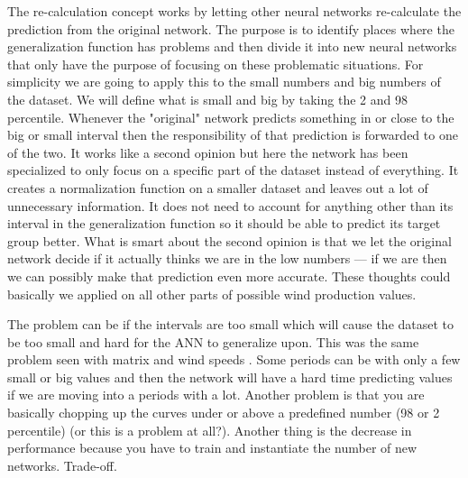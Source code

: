 The re-calculation concept works by letting other neural networks re-calculate the prediction from the original network. The purpose is to identify places where the generalization function has problems and then divide it into new neural networks that only have the purpose of focusing on these problematic situations. For simplicity we are going to apply this to the small numbers and big numbers of the dataset. We will define what is small and big by taking the 2 and 98 percentile. Whenever the "original" network predicts something in or close to the big or small interval then the responsibility of that prediction is forwarded to one of the two. It works like a second opinion but here the network has been specialized to only focus on a specific part of the dataset instead of everything. It creates a normalization function on a smaller dataset and leaves out a lot of unnecessary information. It does not need to account for anything other than its interval in the generalization function so it should be able to predict its target group better. What is smart about the second opinion is that we let the original network decide if it actually thinks we are in the low numbers --- if we are then we can possibly make that prediction even more accurate. These thoughts could basically we applied on all other parts of possible wind production values. 

The problem can be if the intervals are too small which will cause the dataset to be too small and hard for the ANN to generalize upon. This was the same problem seen with matrix and wind speeds . Some periods can be with only a few small or big values and then the network will have a hard time predicting values if we are moving into a periods with a lot. Another problem is that you are basically chopping up the curves under or above a predefined number (98 or 2 percentile) (or this is a problem at all?). Another thing is the decrease in performance because you have to train and instantiate the number of new networks. Trade-off.

